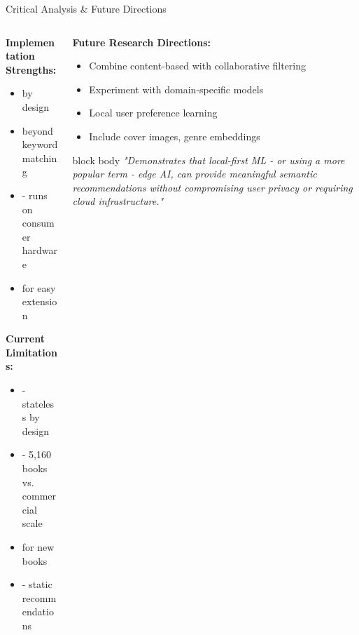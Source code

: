 \begin{frame}{Critical Analysis \& Future Directions}

\begin{columns}[T]
  \begin{column}{0.50\textwidth}
    \textbf{Implementation Strengths:}
    \begin{itemize}
      \item {} by design
      \item {} beyond keyword matching
      \item {} - runs on consumer hardware
      \item {} for easy extension
    \end{itemize}

    \vspace{0.1cm}
    \textbf{Current Limitations:}
    \begin{itemize}
      \item {} - stateless by design
      \item {} - 5,160 books vs. commercial scale
      \item {} for new books
      \item {} - static recommendations
    \end{itemize}
  \end{column}

  \begin{column}{0.45\textwidth}
    \textbf{Future Research Directions:}
    \begin{itemize}
      \item {} Combine content-based with collaborative filtering
      \item {} Experiment with domain-specific models
      \item {} Local user preference learning
      \item {} Include cover images, genre embeddings
    \end{itemize}

    \begin{center}
    \begin{beamercolorbox}[sep=8pt,center,rounded=true]{block body}
    \scriptsize \textit{"Demonstrates that local-first ML - or using a more popular term - edge AI, can provide meaningful semantic recommendations without compromising user privacy or requiring cloud infrastructure."}
    \end{beamercolorbox}
    \end{center}
  \end{column}
\end{columns}

\end{frame}